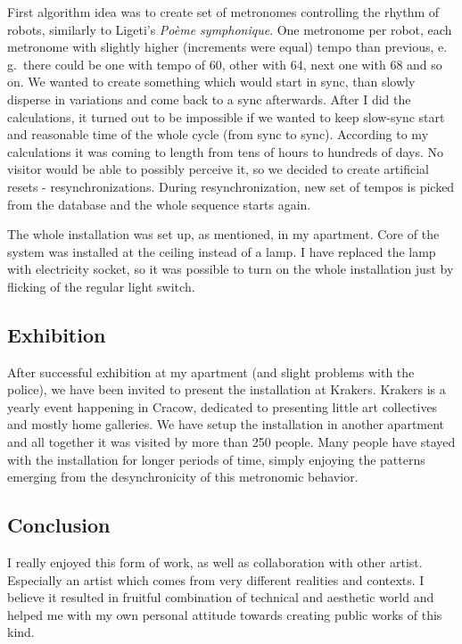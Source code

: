 \documentclass[12pt,a4paper,oneside]{report}
\begin{document}
First algorithm idea was to create set of metronomes controlling the rhythm of robots, similarly to Ligeti's \emph{Poème symphonique}. One metronome per robot, each metronome with slightly higher (increments were equal) tempo than previous, e. g.\ there could be one with tempo of 60, other with 64, next one with 68 and so on. We wanted to create something which would start in sync, than slowly disperse in variations and come back to a sync afterwards. After I did the calculations, it turned out to be impossible if we wanted to keep slow-sync start and reasonable time of the whole cycle (from sync to sync). According to my calculations it was coming to length from tens of hours to hundreds of days. No visitor would be able to possibly perceive it, so we decided to create artificial resets - resynchronizations. During resynchronization, new set of tempos is picked from the database and the whole sequence starts again.

The whole installation was set up, as mentioned, in my apartment. Core of the system was installed at the ceiling instead of a lamp. I have replaced the lamp with electricity socket, so it was possible to turn on the whole installation just by flicking of the regular light switch.

\subsection{Exhibition} After successful exhibition at my apartment (and slight problems with the police), we have been invited to present the installation at Krakers. Krakers is a yearly event happening in Cracow, dedicated to presenting little art collectives and mostly home galleries. We have setup the installation in another apartment and all together it was visited by more than 250 people. Many people have stayed with the installation for longer periods of time, simply enjoying the patterns emerging from the desynchronicity of this metronomic behavior.

\subsection{Conclusion} I really enjoyed this form of work, as well as collaboration with other artist. Especially an artist which comes from very different realities and contexts. I believe it resulted in fruitful combination of technical and aesthetic world and helped me with my own personal attitude towards creating public works of this kind.
\end{document}
